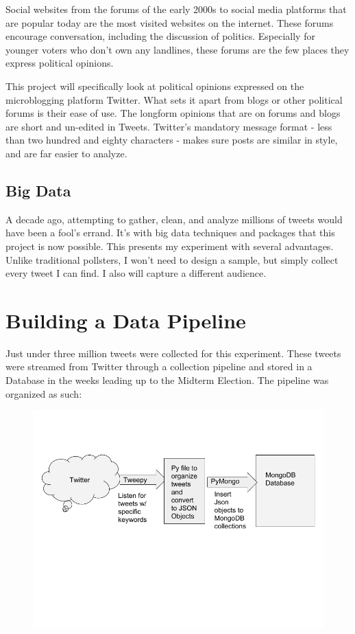 \documentclass[11pt, twoside, reqno]{book}
\begin{document}
Social websites from the forums of the early 2000s to social media platforms that are popular today are the most visited websites on the internet. These forums encourage conversation, including the discussion of politics. Especially for younger voters who don’t own any landlines, these forums are the few places they express political opinions. 

This project will specifically look at political opinions expressed on the microblogging platform Twitter. What sets it apart from blogs or other political forums is their ease of use. The longform opinions that are on forums and blogs are short and un-edited in Tweets. Twitter’s mandatory message format - less than two hundred and eighty characters - makes sure posts are similar in style, and are far easier to analyze. 

\section{Big Data}
\hspace{0.2in}A decade ago, attempting to gather, clean, and analyze millions of tweets would have been a fool's errand. It's with big data techniques and packages that this project is now possible. This presents my experiment with several advantages. Unlike traditional pollsters, I won't need to design a sample, but simply collect every tweet I can find. I also will capture a different audience. 




\chapter{Building a Data Pipeline}
\label{Ch:2}
\hspace{0.2in} Just under three million tweets were collected for this experiment. These tweets were streamed from Twitter through a collection pipeline and stored in a Database in the weeks leading up to the Midterm Election. The pipeline was organized as such:

\begin{figure}[h]
	\includegraphics[scale=0.5]{data_collection}
\end{figure}
\end{document}
